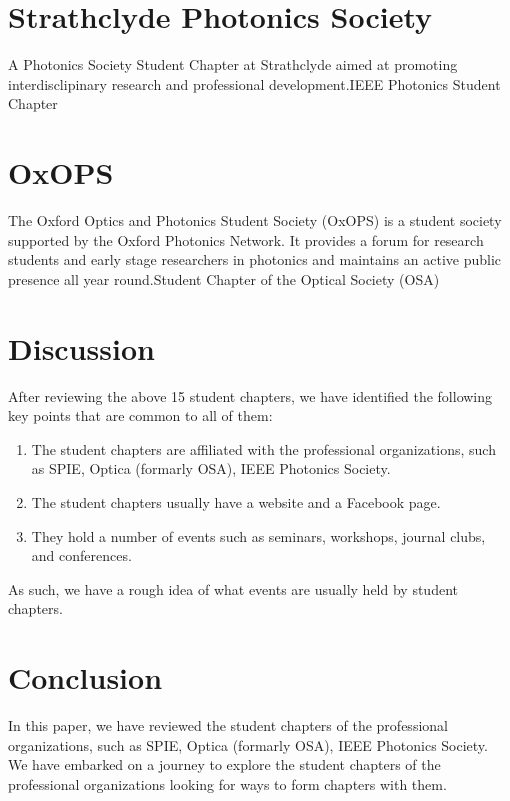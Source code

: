 \documentclass[12pt, a4paper, twocolumn]{article}
\begin{document}
    \section{Strathclyde Photonics Society}
    A Photonics Society Student Chapter at Strathclyde aimed at promoting interdisclipinary research and professional development.IEEE Photonics Student Chapter

    \section{OxOPS}
    The Oxford Optics and Photonics Student Society (OxOPS) is a student society supported by the Oxford Photonics Network. It provides a forum for research students and early stage researchers in photonics and maintains an active public presence all year round.Student Chapter of the Optical Society (OSA)

    \section*{Discussion}
    After reviewing the above 15 student chapters, we have identified the following key points that are common to all of them:\\
    \begin{enumerate}
        \item The student chapters are affiliated with the professional organizations, such as SPIE, Optica (formarly OSA), IEEE Photonics Society.
        \item The student chapters usually have a website and a Facebook page.
        \item They hold a number of events such as seminars, workshops, journal clubs, and conferences.
    \end{enumerate}
    As such, we have a rough idea of what events are usually held by student chapters.

    \section*{Conclusion}
    In this paper, we have reviewed the student chapters of the professional organizations, such as SPIE, Optica (formarly OSA), IEEE Photonics Society.
    We have embarked on a journey to explore the student chapters of the professional organizations looking for ways to form chapters with them.

    \nocite{*}
    
    
\end{document}
